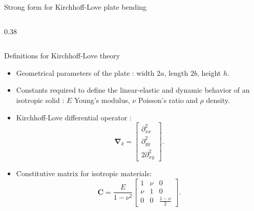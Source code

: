 \documentclass[aspectratio=169]{beamer}
\begin{document}
{\begin{frame}{Strong form for Kirchhoff-Love plate bending}
\begin{columns}
      \begin{column}{0.38\textwidth}
        \begin{center}
        \end{center}
      \end{column}
    \end{columns}
  \end{frame}

  \begin{frame}{Definitions for Kirchhoff-Love theory}
    \begin{itemize}
      \item Geometrical parameters of the plate : width $2a$, length $2b$,  height $h$.
      \item Constants required to define the linear-elastic and dynamic behavior of an isotropic solid : $E$ Young's modulus, $\nu$ Poisson's ratio and $\rho$ density.
      \item Kirchhoff-Love differential operator :
            {\small$$\boldsymbol{\nabla}_{k}=\begin{bmatrix}
                \partial^2_{xx} \\[7pt]
                \partial^2_{yy} \\[7pt]
                2\partial^2_{xy}
              \end{bmatrix}.$$}
      \item Constitutive matrix for isotropic materials: {\small$$\boldsymbol{C}=\frac{E}{1 - \nu^2}
              \begin{bmatrix}
                1   & \nu & 0                 \\
                \nu & 1   & 0                 \\
                0   & 0   & \frac{1 - \nu}{2}
              \end{bmatrix}.$$}
    \end{itemize}
  \end{frame}

}
\end{document}
